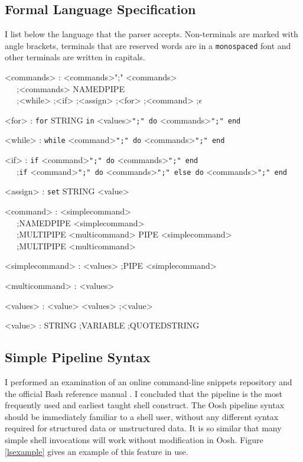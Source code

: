 \documentclass[12pt,twoside,notitlepage]{report}
\begin{document}
\subsection{Formal Language Specification}
I list below the language that the parser accepts. Non-terminals are
marked with angle brackets, terminals that are reserved words are in a
{\tt monospaced} font and other terminals are written in capitals.

\label{grammar}
\begin{grammar}
<commands> : <commands>";" <commands>\\
\textcolor{white}{tab};<commands> NAMEDPIPE\\
\textcolor{white}{tab};<while> ;<if> ;<assign> ;<for> ;<command> ;$\epsilon$

<for> : {\tt for} STRING {\tt in} <values>{\tt ";" do} <commands>{\tt ";" end}

<while> : {\tt while} <command>{\tt ";" do} <commands>{\tt ";" end}

<if> : {\tt if} <command>{\tt ";" do} <commands>{\tt ";" end}\\
\textcolor{white}{tab};{\tt if} <command>{\tt ";" do} <commands>{\tt ";" else do} <commands>{\tt ";" end}

<assign> : {\tt set} STRING <value>

<command> : <simplecommand>\\
\textcolor{white}{tab};NAMEDPIPE <simplecommand>\\
\textcolor{white}{tab};MULTIPIPE <multicommand> PIPE <simplecommand>\\
\textcolor{white}{tab};MULTIPIPE <multicommand>

<simplecommand> : <values>
;PIPE <simplecommand>
    
<multicommand> : <values>

<values> : <value> <values> ;<value>

<value> : STRING ;VARIABLE ;QUOTEDSTRING

\end{grammar}

\subsection{Simple Pipeline Syntax}

I performed an examination of an online command-line snippets
repository \cite{clifu} and the official Bash reference manual
\cite{bashman}. I concluded that the pipeline is the most frequently
used and earliest taught shell construct. The Oosh pipeline syntax
should be immediately familiar to a shell user, without any different
syntax required for structured data or unstructured data. It is so
similar that many simple shell invocations will work without modification in
Oosh. Figure \ref{lsexample} gives an example of this feature in use.
\end{document}
